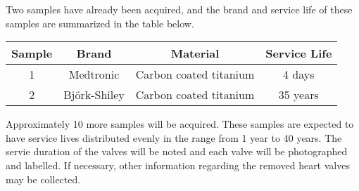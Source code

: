Two samples have already been acquired, and the brand and service life of these samples are summarized in the table below.

\begin{center}
    \begin{tabular}{|c|c|c|c|}
        \hline
        Sample & Brand & Material & Service Life \\
        \hline
        1 & Medtronic\cite*{medtronic_image} & Carbon coated titanium & 4 days \\
        \hline
        2 & Björk-Shiley\cite*{björk1969} & Carbon coated titanium & 35 years \\
        \hline
    \end{tabular}
\end{center}

Approximately 10 more samples will be acquired. These samples are expected to have service lives distributed evenly in the range from 1 year to 40 years.
The servie duration of the valves will be noted and each valve will be photographed and labelled.
If necessary, other information regarding the removed heart valves may be collected.

